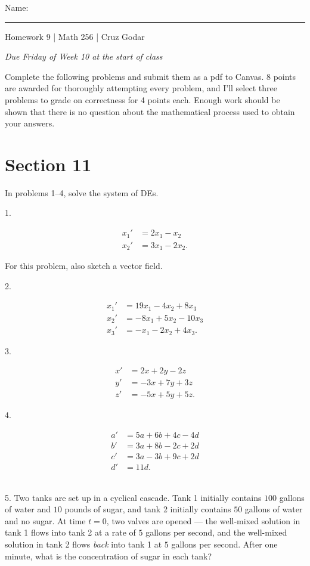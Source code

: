 \documentclass{article}
\begin{document}
\Large Name: \rule{2in}{0.15mm} \hfill Homework 9 | Math 256 | Cruz Godar \vspace{4pt} \normalsize

\textit{Due Friday of Week 10 at the start of class}

Complete the following problems and submit them as a pdf to Canvas. 8 points are awarded for thoroughly attempting every problem, and I'll select three problems to grade on correctness for 4 points each. Enough work should be shown that there is no question about the mathematical process used to obtain your answers.

\section{Section 11}

In problems 1--4, solve the system of DEs.

1.

\begin{align*}
	x_1' &= 2x_1 - x_2\\
	x_2' &= 3x_1 - 2x_2.
\end{align*}

For this problem, also sketch a vector field.

2.

\begin{align*}
	x_1' &= 19x_1 - 4x_2 + 8x_3\\
	x_2' &= -8x_1 + 5x_2 - 10x_3\\
	x_3' &= -x_1 - 2x_2 + 4x_3.
\end{align*}

3.

\begin{align*}
	x' &= 2x + 2y - 2z\\
	y' &= -3x + 7y + 3z\\
	z' &= -5x + 5y + 5z.
\end{align*}

4.

\begin{align*}
	a' &= 5a + 6b + 4c - 4d\\
	b' &= 3a + 8b - 2c + 2d\\
	c' &= 3a - 3b + 9c + 2d\\
	d' &= 11d.
\end{align*}

~\\

5. Two tanks are set up in a cyclical cascade. Tank 1 initially contains $100$ gallons of water and $10$ pounds of sugar, and tank 2 initially contains $50$ gallons of water and no sugar. At time $t = 0$, two valves are opened --- the well-mixed solution in tank 1 flows into tank 2 at a rate of $5$ gallons per second, and the well-mixed solution in tank 2 flows \textit{back} into tank 1 at $5$ gallons per second. After one minute, what is the concentration of sugar in each tank?
\end{document}
